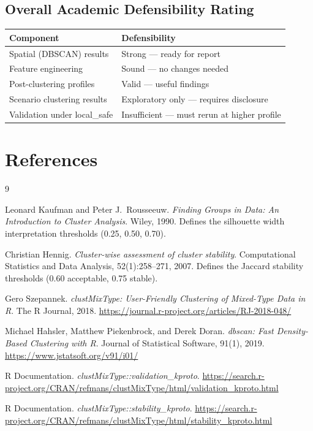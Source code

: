 \documentclass[11pt]{article}
\begin{document}
\subsection{Overall Academic Defensibility Rating}

\begin{center}
\begin{tabular}{|l|l|}
\hline
\textbf{Component} & \textbf{Defensibility} \\
\hline
Spatial (DBSCAN) results & \textcolor{passgreen}{Strong --- ready for report} \\
Feature engineering & \textcolor{passgreen}{Sound --- no changes needed} \\
Post-clustering profiles & \textcolor{passgreen}{Valid --- useful findings} \\
Scenario clustering results & \textcolor{warnamber}{Exploratory only --- requires disclosure} \\
Validation under local\_safe & \textcolor{failred}{Insufficient --- must rerun at higher profile} \\
\hline
\end{tabular}
\end{center}

\section{References}

\begin{thebibliography}{9}

Leonard Kaufman and Peter J.\ Rousseeuw.
\textit{Finding Groups in Data: An Introduction to Cluster Analysis}.
Wiley, 1990. Defines the silhouette width interpretation thresholds (0.25, 0.50, 0.70).

Christian Hennig.
\textit{Cluster-wise assessment of cluster stability}.
Computational Statistics and Data Analysis, 52(1):258--271, 2007.
Defines the Jaccard stability thresholds (0.60 acceptable, 0.75 stable).

Gero Szepannek.
\textit{clustMixType: User-Friendly Clustering of Mixed-Type Data in R}.
The R Journal, 2018.
\url{https://journal.r-project.org/articles/RJ-2018-048/}

Michael Hahsler, Matthew Piekenbrock, and Derek Doran.
\textit{dbscan: Fast Density-Based Clustering with R}.
Journal of Statistical Software, 91(1), 2019.
\url{https://www.jstatsoft.org/v91/i01/}

R Documentation.
\textit{clustMixType::validation\_kproto}.
\url{https://search.r-project.org/CRAN/refmans/clustMixType/html/validation_kproto.html}

R Documentation.
\textit{clustMixType::stability\_kproto}.
\url{https://search.r-project.org/CRAN/refmans/clustMixType/html/stability_kproto.html}

\end{thebibliography}
\end{document}
